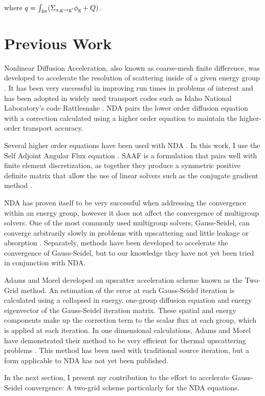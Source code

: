 where $q = \int_{4\pi}(\Sigma_{s, \mathrm{g} \rightarrow \mathrm{g}'}\phi_{\mathrm{g}} + Q)$. 
\

\section{Previous Work}

Nonlinear Diffusion Acceleration, also known as coarse-mesh finite difference, was developed to accelerate the resolution of scattering inside of a given energy group \cite{Knoll2011, park-nda}. It has been very successful in improving run times in problems of interest and has been adopted in widely used transport codes such as Idaho National Laboratory's code Rattlesnake \cite{Wang2013, Schunert2017, morel-holo}. NDA pairs the lower order diffusion equation with a correction calculated using a higher order equation to maintain the higher-order transport accuracy. 

Several higher order equations have been used with NDA \cite{morel-holo, Wang2013}. In this work, I use the Self Adjoint Angular Flux equation \cite{saaf}. SAAF is a formulation that pairs well with finite element discretization, as together they produce a symmetric positive definite matrix that allow the use of linear solvers such as the conjugate gradient method \cite{Shewchuck1994}.

NDA has proven itself to be very successful when addressing the convergence within an energy group, however it does not affect the convergence of multigroup solvers. One of the most commonly used multigroup solvers, Gauss-Seidel, can converge arbitrarily slowly in problems with upscattering and little leakage or absorption \cite{morel-upscat, evans-upscat}. Separately, methods have been developed to accelerate the convergence of Gauss-Seidel, but to our knowledge they have not yet been tried in conjunction with NDA. 

Adams and Morel developed an upscatter acceleration scheme known as the Two-Grid method. An estimation of the error at each Gauss-Seidel iteration is calculated using a collapsed in energy, one-group diffusion equation and energy eigenvector of the Gauss-Seidel iteration matrix. These spatial and energy components make up the correction term to the scalar flux at each group, which is applied at each iteration. In one dimensional calculations, Adams and Morel have demonstrated their method to be very efficient for thermal upscattering problems \cite{morel-upscat}. This method has been used with traditional source iteration, but a form applicable to NDA has not yet been published.

In the next section, I present my contribution to the effort to accelerate Gauss-Seidel convergence: A two-grid scheme particularly for the NDA equations. 